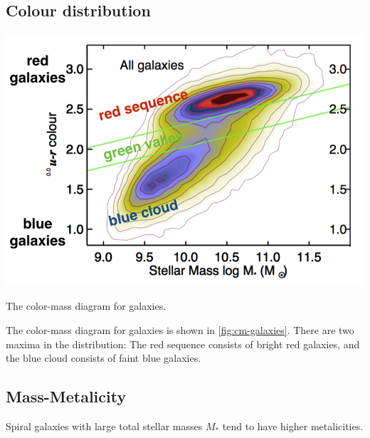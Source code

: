 \subsection{Colour distribution}
\begin{marginfigure}
	\includegraphics[width=\textwidth]{img/ch-05/cm-galaxies.png}
	\caption{The color-mass diagram for galaxies.}
	\label{fig:cm-galaxies}
\end{marginfigure}
The color-mass diagram for galaxies is shown in \cref{fig:cm-galaxies}.
There are two maxima in the distribution: 
The red sequence consists of bright red galaxies,
and the blue cloud consists of faint blue galaxies.

\subsection{Mass-Metalicity}
Spiral galaxies with large total stellar masses $M_*$ tend to have higher metalicities.

